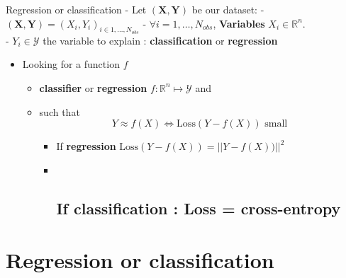 \documentclass[
  12pt,
  ignorenonframetext,
  compress]{beamer}
\begin{document}
\begin{frame}{Regression or classification}
- Let \((\mathbf{X},\mathbf{Y})\) be our dataset: -
\((\mathbf{X},\mathbf{Y})=(X_i, Y_i)_{i \in 1, \dots,N_{obs}}\) -
\(\forall i =1,\dots,N_{obs}\), \textbf{Variables}
\(X_i \in \mathbb{R}^n\).\\
- \(Y_i \in \mathcal{Y}\) the variable to explain :
\textbf{classification} or \textbf{regression}

\begin{itemize}
\item
  Looking for a function \(f\)

  \begin{itemize}
  \item
    \textbf{classifier} or \textbf{regression}
    \(f :\mathbb{R}^n \mapsto \mathcal{Y}\) and
  \item
    such that
    \[Y \approx f(X) \Leftrightarrow \mbox{Loss}(Y -   f(X)) \mbox{ small } \]

    \begin{itemize}
    \item
      If \textbf{regression}
      \(\mbox{Loss}(Y - f(X)) = ||Y - f(X)) ||^2\)
    \item ~
      \hypertarget{if-classification-loss-cross-entropy}{%
      \subsection{\texorpdfstring{If \textbf{classification} : Loss =
      cross-entropy}{If classification : Loss = cross-entropy}}\label{if-classification-loss-cross-entropy}}
    \end{itemize}
  \end{itemize}
\end{itemize}
\end{frame}

\hypertarget{regression-or-classification-1}{%
\section{Regression or
classification}\label{regression-or-classification-1}}
\end{document}

